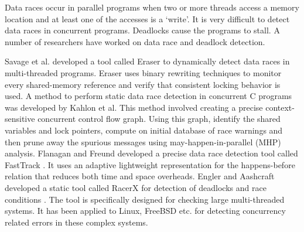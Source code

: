 Data races occur in parallel programs when two or more threads access a memory location and at least one of the accesses is a ‘write’.  It is very difficult to detect data races in concurrent programs. Deadlocks cause the programs to stall. A number of researchers have worked on data race and deadlock detection.

Savage et al. developed a tool called Eraser \cite{savage1997eraser} to dynamically detect data races in multi-threaded programs. Eraser uses binary rewriting techniques to monitor every shared-memory reference and verify that consistent locking behavior is used. A method to perform static data race detection in concurrent C programs was developed by Kahlon et al. This method \cite{kahlon2009static} involved creating a precise context-sensitive concurrent control flow graph. Using this graph, identify the shared variables and lock pointers, compute on initial database of race warnings and then prune away the spurious messages using may-happen-in-parallel (MHP) analysis. Flanagan and Freund developed a precise data race detection tool called FastTrack \cite{flanagan2009fasttrack}. It uses an adaptive lightweight representation for the happens-before relation that reduces both time and space overheads. Engler and Aashcraft developed a static tool called RacerX for detection of deadlocks and race conditions \cite{engler2003racerx}. The tool is specifically designed for checking large multi-threaded systems. It has been applied to Linux, FreeBSD etc. for detecting concurrency related errors in these complex systems. 